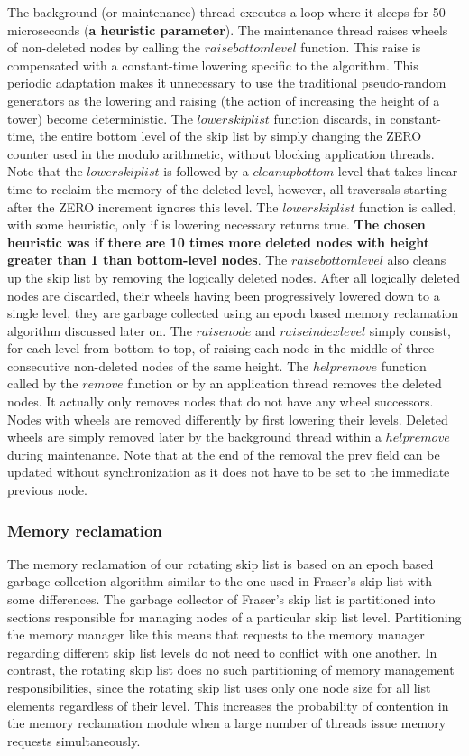 \documentclass{article}
\begin{document}
The background (or maintenance) thread executes a loop where it sleeps for 50 microseconds (\textbf{a heuristic parameter}). The maintenance thread raises wheels of non-deleted nodes by calling the $raise bottom level$ function. This raise is compensated with a constant-time lowering specific to the algorithm. This periodic adaptation makes it unnecessary to use the traditional pseudo-random generators as the lowering and raising (the action of increasing the height of a tower) become deterministic. The $lower skiplist$ function discards, in constant-time, the entire bottom level of the skip list by simply changing the ZERO counter used in the modulo arithmetic, without blocking application threads. Note that the $lower skiplist$ is followed by a $cleanup bottom$ level that takes linear time to reclaim the memory of the deleted level, however, all traversals starting after the ZERO increment ignores this level. The $lower skiplist$ function is called, with some heuristic, only if is lowering necessary returns true. \textbf{The chosen heuristic was if there are 10 times more deleted nodes with height greater than 1 than bottom-level nodes}. The $raise bottom level$ also cleans up the skip list by removing the logically deleted nodes. After all logically deleted nodes are discarded, their wheels having been progressively lowered down to a single level, they are garbage collected using an epoch based memory reclamation algorithm discussed later on. The $raise node$ and $raise index level$ simply consist, for each level from bottom to top, of raising each node in the middle of three consecutive non-deleted nodes of the same height. The $help remove$ function called by the $remove$ function or by an application thread removes the deleted nodes. It actually only removes nodes that do not have any wheel successors. Nodes with wheels are removed differently by first lowering their levels. Deleted wheels are simply removed later by the background thread within a $help remove$ during maintenance. Note that at the end of the removal the prev field can be updated without synchronization as it does not have to be set to the immediate previous node.

\subsubsection{Memory reclamation}
\label{ssec:bt}

The memory reclamation of our rotating skip list is based on an epoch based garbage collection algorithm similar to the one used in Fraser’s skip list \cite{C4} with some differences. The garbage collector of Fraser’s skip list is partitioned into sections responsible for managing nodes of a particular skip list level. Partitioning the memory manager like this means that requests to the memory manager regarding different skip list levels do not need to conflict with one another. In contrast, the rotating skip list does no such partitioning of memory management responsibilities, since the rotating skip list uses only one node size for all list elements regardless of their level. This increases the probability of contention in the memory reclamation module when a large number of threads issue memory requests simultaneously.
\end{document}
